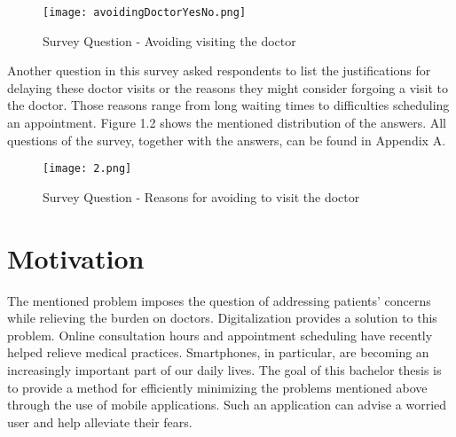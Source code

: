 \begin{figure}[H]
	\centering
	\texttt{[image: avoidingDoctorYesNo.png]}
	\caption[Survey Question]{Survey Question - Avoiding visiting the doctor}
\end{figure}
\noindent 
Another question in this survey asked respondents to list the justifications for delaying these doctor visits or the reasons they might consider forgoing a visit to the doctor. Those reasons range from long waiting times to difficulties scheduling an appointment. Figure 1.2 shows the mentioned distribution of the answers. All questions of the survey, together with the answers, can be found in Appendix A.
\begin{figure}[H]
	\centering
	\texttt{[image: 2.png]}
	\caption[Survey Question]{Survey Question - Reasons for avoiding to visit the doctor}
\end{figure}
\noindent 

\section{Motivation}
The mentioned problem imposes the question of addressing patients' concerns while relieving the burden on doctors. Digitalization provides a solution to this problem. Online consultation hours and appointment scheduling have recently helped relieve medical practices. Smartphones, in particular, are becoming an increasingly important part of our daily lives. The goal of this bachelor thesis is to provide a method for efficiently minimizing the problems mentioned above through the use of mobile applications. Such an application can advise a worried user and help alleviate their fears.

